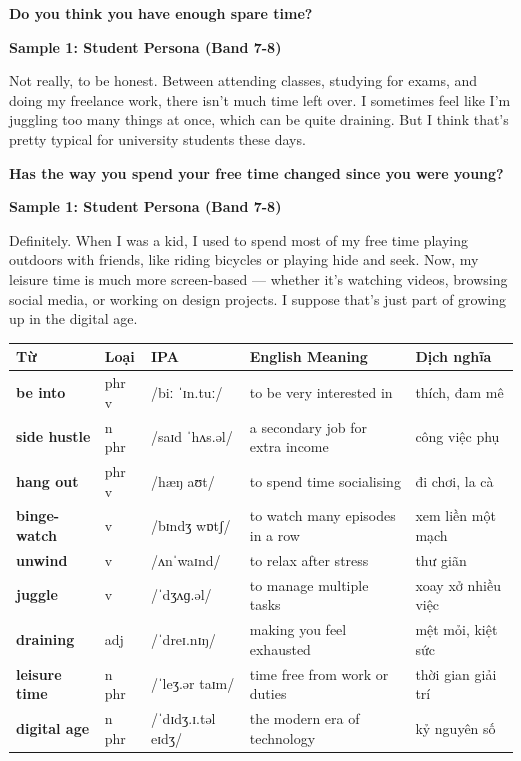 \separator

\begin{ieltsquestion}
\textbf{Do you think you have enough spare time?}
\end{ieltsquestion}
\textbf{Sample 1: Student Persona (Band 7-8)}

Not really, to be honest. Between attending classes, studying for exams, and doing my freelance work, there isn't much time left over. I sometimes feel like I'm juggling too many things at once, which can be quite draining. But I think that's pretty typical for university students these days.

\separator

\begin{ieltsquestion}
\textbf{Has the way you spend your free time changed since you were young?}
\end{ieltsquestion}
\textbf{Sample 1: Student Persona (Band 7-8)}

Definitely. When I was a kid, I used to spend most of my free time playing outdoors with friends, like riding bicycles or playing hide and seek. Now, my leisure time is much more screen-based — whether it's watching videos, browsing social media, or working on design projects. I suppose that's just part of growing up in the digital age.

\separator


\vspace{0.8em}
\begin{center}
\renewcommand{\arraystretch}{1.65}
\begin{tabularx}{\textwidth}{|V{0.22\textwidth}|C{0.07\textwidth}|I{0.20\textwidth}|Y|V{0.18\textwidth}|}
\hline
{}
\textbf{Từ} & \textbf{Loại} & \textbf{IPA} & \textbf{English Meaning} & \textbf{Dịch nghĩa} \\
\hline
\textbf{be into} & phr v & /biː ˈɪn.tuː/ & to be very interested in & thích, đam mê \\ \hline
\textbf{side hustle} & n phr & /saɪd ˈhʌs.əl/ & a secondary job for extra income & công việc phụ \\ \hline
\textbf{hang out} & phr v & /hæŋ aʊt/ & to spend time socialising & đi chơi, la cà \\ \hline
\textbf{binge-watch} & v & /bɪndʒ wɒtʃ/ & to watch many episodes in a row & xem liền một mạch \\ \hline
\textbf{unwind} & v & /ʌnˈwaɪnd/ & to relax after stress & thư giãn \\ \hline
\textbf{juggle} & v & /ˈdʒʌɡ.əl/ & to manage multiple tasks & xoay xở nhiều việc \\ \hline
\textbf{draining} & adj & /ˈdreɪ.nɪŋ/ & making you feel exhausted & mệt mỏi, kiệt sức \\ \hline
\textbf{leisure time} & n phr & /ˈleʒ.ər taɪm/ & time free from work or duties & thời gian giải trí \\ \hline
\textbf{digital age} & n phr & /ˈdɪdʒ.ɪ.təl eɪdʒ/ & the modern era of technology & kỷ nguyên số \\ \hline
\end{tabularx}
\end{center}

